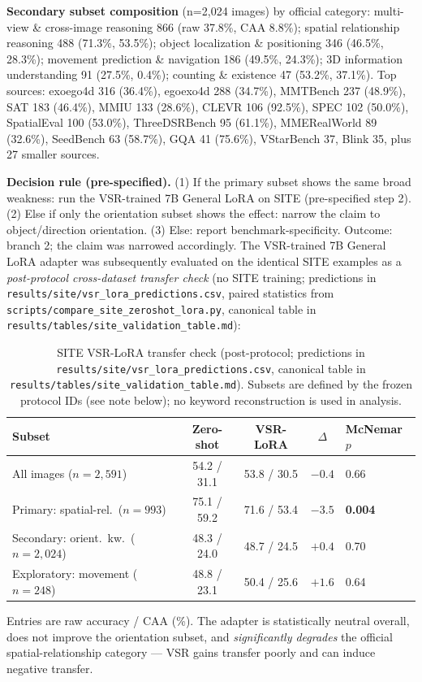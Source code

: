 \textbf{Secondary subset composition} (n=2,024 images) by official category:
multi-view \& cross-image reasoning 866 (raw 37.8\%, CAA 8.8\%); spatial
relationship reasoning 488 (71.3\%, 53.5\%); object localization \& positioning
346 (46.5\%, 28.3\%); movement prediction \& navigation 186 (49.5\%, 24.3\%);
3D information understanding 91 (27.5\%, 0.4\%); counting \& existence 47
(53.2\%, 37.1\%). Top sources: exoego4d 316 (36.4\%), egoexo4d 288 (34.7\%),
MMTBench 237 (48.9\%), SAT 183 (46.4\%), MMIU 133 (28.6\%), CLEVR 106 (92.5\%),
SPEC 102 (50.0\%), SpatialEval 100 (53.0\%), ThreeDSRBench 95 (61.1\%),
MMERealWorld 89 (32.6\%), SeedBench 63 (58.7\%), GQA 41 (75.6\%), VStarBench 37,
Blink 35, plus 27 smaller sources.

\textbf{Decision rule (pre-specified).} (1) If the primary subset shows the same
broad weakness: run the VSR-trained 7B General LoRA on SITE (pre-specified step
2). (2) Else if only the orientation subset shows the effect: narrow the claim
to object/direction orientation. (3) Else: report benchmark-specificity. Outcome:
branch 2; the claim was narrowed accordingly. The VSR-trained 7B General LoRA
adapter was subsequently evaluated on the identical SITE examples as a
\emph{post-protocol cross-dataset transfer check} (no SITE training; predictions
in \texttt{results/site/vsr\_lora\_predictions.csv}, paired statistics from
\texttt{scripts/compare\_site\_zeroshot\_lora.py}, canonical table in
\texttt{results/tables/site\_validation\_table.md}):

\begin{table}[h]
\centering
\footnotesize
\caption{SITE VSR-LoRA transfer check (post-protocol; predictions in
\texttt{results/site/vsr\_lora\_predictions.csv}, canonical table in
\texttt{results/tables/site\_validation\_table.md}). Subsets are defined by the
frozen protocol IDs (see note below); no keyword reconstruction is used in
analysis.}
\label{tab:site-transfer}
\begin{tabular}{lcccl}
\toprule
Subset & Zero-shot & VSR-LoRA & $\Delta$ & McNemar $p$ \\
\midrule
All images ($n{=}2{,}591$) & 54.2 / 31.1 & 53.8 / 30.5 & $-0.4$ & 0.66 \\
Primary: spatial-rel.\ ($n{=}993$) & 75.1 / 59.2 & 71.6 / 53.4 & $-3.5$ & \textbf{0.004} \\
Secondary: orient.\ kw.\ ($n{=}2{,}024$) & 48.3 / 24.0 & 48.7 / 24.5 & $+0.4$ & 0.70 \\
Exploratory: movement ($n{=}248$) & 48.8 / 23.1 & 50.4 / 25.6 & $+1.6$ & 0.64 \\
\bottomrule
\end{tabular}
\end{table}
Entries are raw accuracy / CAA (\%). The adapter is statistically neutral
overall, does not improve the orientation subset, and \emph{significantly
degrades} the official spatial-relationship category --- VSR gains transfer
poorly and can induce negative transfer.

